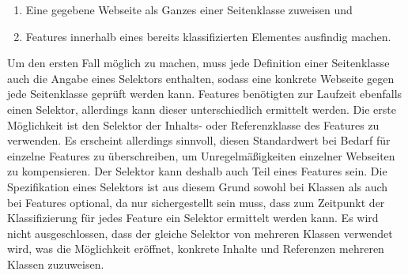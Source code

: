         \begin{enumerate}
            \item Eine gegebene Webseite als Ganzes einer Seitenklasse zuweisen und
            \item Features innerhalb eines bereits klassifizierten Elementes ausfindig machen.
        \end{enumerate}

        Um den ersten Fall möglich zu machen,
        muss jede Definition einer Seitenklasse auch die Angabe eines Selektors enthalten,
        sodass eine konkrete Webseite gegen jede Seitenklasse geprüft werden kann.
        Features benötigten zur Laufzeit ebenfalls einen Selektor,
        allerdings kann dieser unterschiedlich ermittelt werden.
        Die erste Möglichkeit ist den Selektor der Inhalts- oder
        Referenzklasse des Features zu verwenden.
        Es erscheint allerdings sinnvoll, diesen Standardwert bei Bedarf für einzelne Features
        zu überschreiben, um Unregelmäßigkeiten einzelner Webseiten zu kompensieren.
        Der Selektor kann deshalb auch Teil eines Features sein.
        Die Spezifikation eines Selektors ist aus diesem Grund sowohl
        bei Klassen als auch bei Features optional,
        da nur sichergestellt sein muss, dass zum Zeitpunkt der Klassifizierung für jedes
        Feature ein Selektor ermittelt werden kann.        
        Es wird nicht ausgeschlossen, dass der gleiche Selektor von mehreren Klassen verwendet wird,
        was die Möglichkeit eröffnet, konkrete Inhalte und Referenzen mehreren Klassen zuzuweisen.
